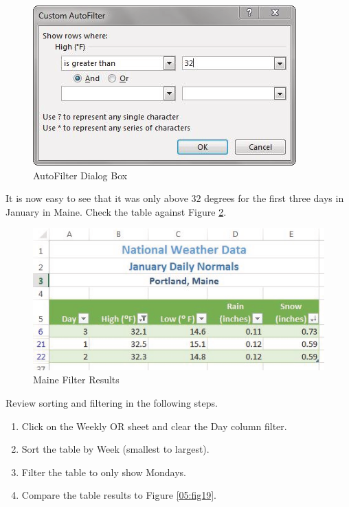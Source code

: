 \begin{figure}[H]
	\centering
	\includegraphics[width=\maxwidth{.95\linewidth}]{gfx/ch05_fig17}
	\caption{AutoFilter Dialog Box}
	\label{05:fig17}
\end{figure}

It is now easy to see that it was only above $ 32 $ degrees for the first three days in January in Maine. Check the table against Figure \ref{05:fig18}.

\begin{figure}[H]
	\centering
	\includegraphics[width=\maxwidth{.95\linewidth}]{gfx/ch05_fig18}
	\caption{Maine Filter Results}
	\label{05:fig18}
\end{figure}

Review sorting and filtering in the following steps.

\begin{enumerate}
	\item Click on the Weekly OR sheet and clear the Day column filter.
	\item Sort the table by Week (smallest to largest).
	\item Filter the table to only show Mondays.
	\item Compare the table results to Figure \ref{05:fig19}.
\end{enumerate}


